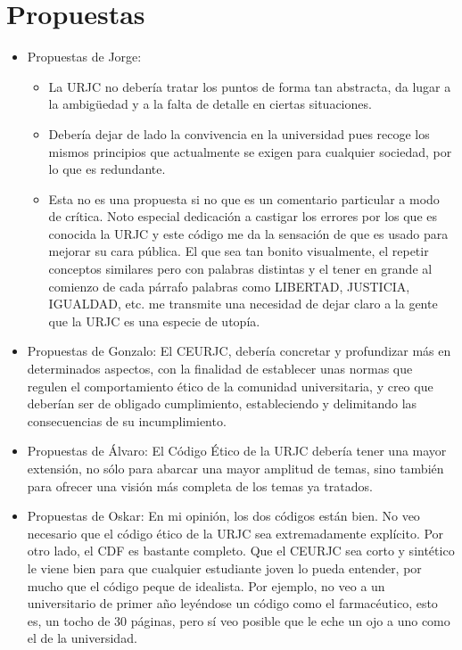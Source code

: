 \documentclass[11pt,a4paper]{article}
\begin{document}
\section{Propuestas}
\begin{itemize}
	\item Propuestas de Jorge:
		\begin{itemize}
			\item La URJC no debería tratar los puntos de forma tan abstracta, da lugar a la ambigüedad y a la falta de detalle en ciertas situaciones.

			\item Debería dejar de lado la convivencia en la universidad pues recoge los mismos principios que actualmente se exigen para cualquier sociedad, por lo que es redundante.

			\item Esta no es una propuesta si no que es un comentario particular a modo de crítica. Noto especial dedicación a castigar los errores por los que es conocida la URJC y este código me da la sensación de que es usado para mejorar su cara pública. El que sea tan bonito visualmente, el repetir conceptos similares pero con palabras distintas y el tener en grande al comienzo de cada párrafo palabras como LIBERTAD, JUSTICIA, IGUALDAD, etc. me transmite una necesidad de dejar claro a la gente que la URJC es una especie de utopía.



		\end{itemize}
	\item Propuestas de Gonzalo:
El CEURJC, debería concretar y profundizar más en determinados aspectos, con la finalidad de establecer unas normas que regulen el comportamiento ético de la comunidad universitaria, y creo que deberían ser de obligado cumplimiento, estableciendo y delimitando las consecuencias de su incumplimiento.

\item Propuestas de Álvaro:
El Código Ético de la URJC debería tener una mayor extensión, no sólo para abarcar una mayor amplitud de temas, sino también para ofrecer una visión más completa de los temas ya tratados.

\item Propuestas de Oskar:
En mi opinión, los dos códigos están bien. No veo necesario que el código ético de la URJC sea extremadamente explícito. Por otro lado, el CDF es bastante completo. Que el CEURJC sea corto y sintético le viene bien para que cualquier estudiante joven lo pueda entender, por mucho que el código peque de idealista. Por ejemplo, no veo a un universitario de primer año leyéndose un código como el farmacéutico, esto es, un tocho de 30 páginas, pero sí veo posible que le eche un ojo a uno como el de la universidad.
\end{itemize}
\pagebreak
\setcounter{secnumdepth}{0}
\end{document}
